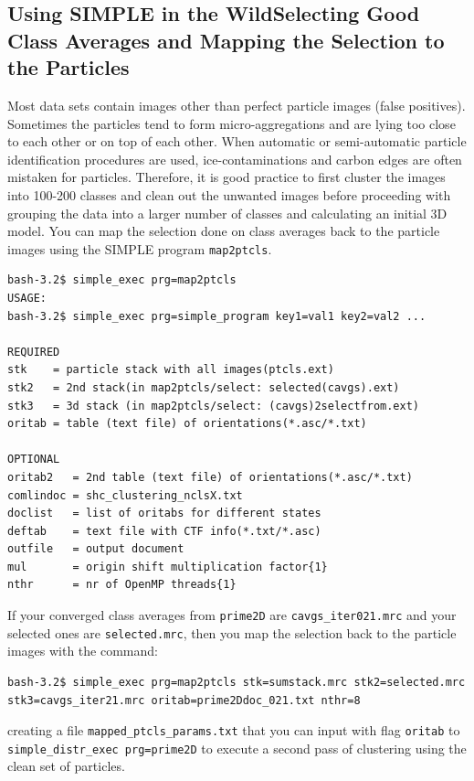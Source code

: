 \documentclass[a4paper,11pt]{article}
\newcommand{\prgname}[1]{\textcolor{NavyBlue}{\texttt{#1}}}
\begin{document}
\begin{tcolorbox}[breakable,colback=white,colframe=orange,width=\dimexpr\textwidth+12mm\relax,enlarge left by=-6mm]
\subsection{Using SIMPLE in the Wild\textemdash{}Selecting Good Class Averages and Mapping the Selection to the Particles}
Most data sets contain images other than perfect particle images (false positives). Sometimes the particles tend to form micro-aggregations and are lying too close to each other or on top of each other. When automatic or semi-automatic particle identification procedures are used, ice-contaminations and carbon edges are often mistaken for particles. Therefore, it is good practice to first cluster the images into 100-200 classes and clean out the unwanted images before proceeding with grouping the data into a larger number of classes and calculating an initial 3D model. You can map the selection done on class averages back to the particle images using the SIMPLE program \prgname{map2ptcls}.
\begin{verbatim}
bash-3.2$ simple_exec prg=map2ptcls
USAGE:
bash-3.2$ simple_exec prg=simple_program key1=val1 key2=val2 ...

REQUIRED
stk    = particle stack with all images(ptcls.ext)
stk2   = 2nd stack(in map2ptcls/select: selected(cavgs).ext)
stk3   = 3d stack (in map2ptcls/select: (cavgs)2selectfrom.ext)
oritab = table (text file) of orientations(*.asc/*.txt)

OPTIONAL
oritab2   = 2nd table (text file) of orientations(*.asc/*.txt)
comlindoc = shc_clustering_nclsX.txt
doclist   = list of oritabs for different states
deftab    = text file with CTF info(*.txt/*.asc)
outfile   = output document
mul       = origin shift multiplication factor{1}
nthr      = nr of OpenMP threads{1}
\end{verbatim}
If your converged class averages from \prgname{prime2D} are \texttt{cavgs\_iter021.mrc} and your selected ones are \texttt{selected.mrc}, then you map the selection back to the particle images with the command:
\begin{verbatim}
bash-3.2$ simple_exec prg=map2ptcls stk=sumstack.mrc stk2=selected.mrc
stk3=cavgs_iter21.mrc oritab=prime2Ddoc_021.txt nthr=8
\end{verbatim}
creating a file \texttt{mapped\_ptcls\_params.txt} that you can input with flag \texttt{oritab} to \texttt{simple\_distr\_exec prg=prime2D} to execute a second pass of clustering using the clean set of particles.
\end{tcolorbox}
\end{document}
